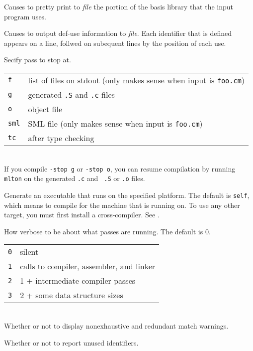 \begin{description}
Causes {\mlton} to pretty print to {\it file} the portion of the basis
library that the input program uses.

Causes {\mlton} to output def-use information to {\it file}.  Each
identifier that is defined appears on a line, follwed on subequent
lines by the position of each use.

Secify pass to stop at.\\
\begin{tabular}{l|l}
{\tt f} & list of files on stdout (only makes sense when input is {\tt foo.cm})\\
{\tt g} & generated {\tt .S} and {\tt .c} files\\
{\tt o} & object file\\
{\tt sml} & SML file (only makes sense when input is {\tt foo.cm})\\
{\tt tc} & after type checking\\
\end{tabular}\\
If you compile {\tt -stop g} or {\tt -stop o}, you can resume
compilation by running {\tt mlton} on the generated {\tt .c} and {\tt
.S} or {\tt .o} files. 

Generate an executable that runs on the specified platform.  The default
is {\tt self}, which means to compile for the machine that {\mlton} is
running on.  To use any other target, you must first install a
cross-compiler.  See .

How verbose to be about what passes are running.  The default is 0.\\
\begin{tabular}{l|l}
{\tt 0} & silent\\
{\tt 1} & calls to compiler, assembler, and linker\\
{\tt 2} & 1 + intermediate compiler passes\\
{\tt 3} & 2 + some data structure sizes\\
\end{tabular}\\

Whether or not to display nonexhaustive and redundant match warnings.

Whether or not to report unused identifiers.

\end{description}

